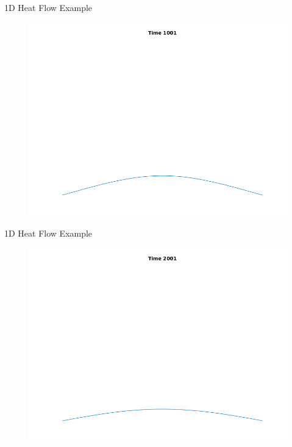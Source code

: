 \documentclass{beamer}
\begin{document}
\begin{frame}{1D Heat Flow Example}

\begin{figure}[t]
    \includegraphics[width=\textwidth]{4.png}
\end{figure}

\end{frame}

\begin{frame}{1D Heat Flow Example}

\begin{figure}[t]
    \includegraphics[width=\textwidth]{5.png}
\end{figure}

\end{frame}
\end{document}
